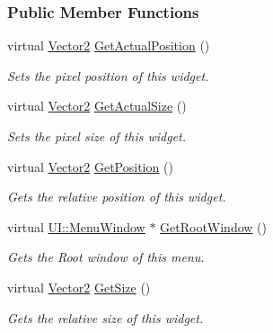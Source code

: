 \subsubsection*{Public Member Functions}
\begin{DoxyCompactItemize}
\item 
virtual \hyperlink{classMezzanine_1_1Vector2}{Vector2} \hyperlink{classMezzanine_1_1UI_1_1Menu_a514ab3a4afb50cd799fe7fde9f877c3d}{GetActualPosition} ()
\begin{DoxyCompactList}\small\item\em Sets the pixel position of this widget. \item\end{DoxyCompactList}\item 
virtual \hyperlink{classMezzanine_1_1Vector2}{Vector2} \hyperlink{classMezzanine_1_1UI_1_1Menu_a301e1b2290e4bc170f527c5dd0179884}{GetActualSize} ()
\begin{DoxyCompactList}\small\item\em Sets the pixel size of this widget. \item\end{DoxyCompactList}\item 
virtual \hyperlink{classMezzanine_1_1Vector2}{Vector2} \hyperlink{classMezzanine_1_1UI_1_1Menu_ac039c785132b468e3aeb5327e656306b}{GetPosition} ()
\begin{DoxyCompactList}\small\item\em Gets the relative position of this widget. \item\end{DoxyCompactList}\item 
virtual \hyperlink{classMezzanine_1_1UI_1_1MenuWindow}{UI::MenuWindow} $\ast$ \hyperlink{classMezzanine_1_1UI_1_1Menu_acab8021587a7af5911b3ed9b44189341}{GetRootWindow} ()
\begin{DoxyCompactList}\small\item\em Gets the Root window of this menu. \item\end{DoxyCompactList}\item 
virtual \hyperlink{classMezzanine_1_1Vector2}{Vector2} \hyperlink{classMezzanine_1_1UI_1_1Menu_a50298380a41d2e8801dffdb9750cb212}{GetSize} ()
\begin{DoxyCompactList}\small\item\em Gets the relative size of this widget. \item\end{DoxyCompactList}\item 

\end{DoxyCompactItemize}
